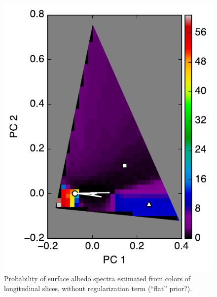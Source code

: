 \documentclass[iop,numberedappendix,apj,]{emulateapj}
\begin{document}
\begin{figure}[bth!]
    \begin{center}
\includegraphics[width=\hsize]{mockdata_90deg_3types_t12_lc_noreg.pdf}
    \end{center}
    \caption{Probability of surface albedo spectra estimated from colors of longitudinal slices, without regularization term (``flat'' prior?). }
\label{fig:noreg}
\end{figure}

\newpage
\end{document}
